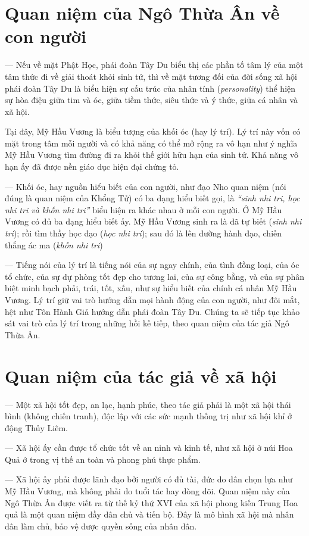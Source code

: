 \hrulefill

\section{Quan niệm của Ngô Thừa Ân về con người} %
\label{sec:1_quan_niem_ve_con_nguoi}

— Nếu về mặt Phật Học, phái đoàn Tây Du biểu thị các phần tố tâm lý của một tâm thức đi về giải thoát khỏi sinh tử, thì về mặt tương đối của đời sống xã hội phái đoàn Tây Du là biểu hiện sự cấu trúc của nhân tính (\emph{personality}) thể hiện sự hòa điệu giữa tim và óc, giữa tiềm thức, siêu thức và ý thức, giữa cá nhân và xã hội.

Tại đây, Mỹ Hầu Vương là biểu tượng của khối óc (hay lý trí). Lý trí này vốn có mặt trong tâm mỗi người và có khả năng có thể mở rộng ra vô hạn như ý nghĩa Mỹ Hầu Vương tìm đường đi ra khỏi thế giới hữu hạn của sinh tử. Khả năng vô hạn ấy đã được nền giáo dục hiện đại chứng tỏ.

— Khối óc, hay nguồn hiểu biết của con người, như đạo Nho quan niệm (nói đúng là quan niệm của Khổng Tử) có ba dạng hiểu biết gọi, là \emph{``sinh nhi tri, học nhi tri và khốn nhi tri''} biểu hiện ra khác nhau ở mỗi con người. Ở Mỹ Hầu Vương có đủ ba dạng hiểu biết ấy. Mỹ Hầu Vương sinh ra là đã tự biết (\emph{sinh nhi tri}); rồi tìm thầy học đạo (\emph{học nhi tri}); sau đó là lên đường hành đạo, chiến thắng ác ma (\emph{khốn nhi tri})

— Tiếng nói của lý trí là tiếng nói của sự ngay chính, của tình đồng loại, của óc tổ chức, của sự dự phòng tốt đẹp cho tương lai, của sự công bằng, và của sự phân biệt minh bạch phải, trái, tốt, xấu, như sự hiểu biết của chính cá nhân Mỹ Hầu Vương. Lý trí giữ vai trò hướng dẫn mọi hành động của con người, như đôi mắt, hệt như Tôn Hành Giả hướng dẫn phái đoàn Tây Du. Chúng ta sẽ tiếp tục khảo sát vai trò của lý trí trong những hồi kế tiếp, theo quan niệm của tác giả Ngô Thừa Ân.


\section{Quan niệm của tác giả về xã hội} %
\label{sec:1_quan_ve_xa_hoi}

— Một xã hội tốt đẹp, an lạc, hạnh phúc, theo tác giả phải là một xã hội thái bình (không chiến tranh), độc lập với các sức mạnh thống trị như xã hội khỉ ở động Thủy Liêm.

— Xã hội ấy cần được tổ chức tốt về an ninh và kinh tế, như xã hội ở núi Hoa Quả ở trong vị thế an toàn và phong phú thực phẩm.

— Xã hội ấy phải được lãnh đạo bởi người có đủ tài, đức do dân chọn lựa như Mỹ Hầu Vương, mà không phải do tuổi tác hay dòng dõi. Quan niệm này của Ngô Thừa Ân được viết ra từ thế kỷ thứ XVI của xã hội phong kiến Trung Hoa quả là một quan niệm đầy dân chủ và tiến bộ. Đây là mô hình xã hội mà nhân dân làm chủ, bảo vệ được quyền sống của nhân dân.
